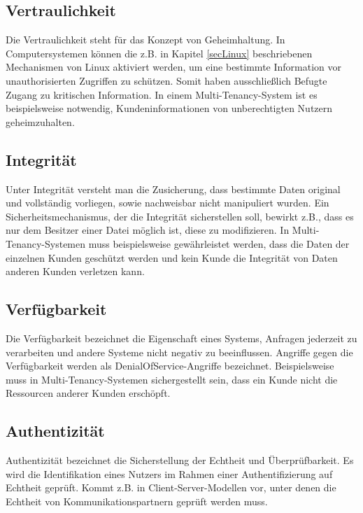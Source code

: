 \documentclass[../main.tex]{subfiles}
\begin{document}


    \subsection{Vertraulichkeit}
			Die Vertraulichkeit steht für das Konzept von Geheimhaltung. In Computersystemen können die z.B. in Kapitel \ref{secLinux} beschriebenen Mechanismen von Linux aktiviert werden, um eine bestimmte Information vor unauthorisierten Zugriffen zu schützen. Somit haben ausschließlich Befugte Zugang zu kritischen Information. In einem Multi-Tenancy-System ist es beispielsweise notwendig, Kundeninformationen von unberechtigten Nutzern geheimzuhalten.

    \subsection{Integrität}
			Unter Integrität versteht man die Zusicherung, dass bestimmte Daten original und vollständig vorliegen, sowie nachweisbar nicht manipuliert wurden. Ein Sicherheitsmechanismus, der die Integrität sicherstellen soll, bewirkt z.B., dass es nur dem Besitzer einer Datei möglich ist, diese zu modifizieren. In Multi-Tenancy-Systemen muss beispielsweise gewährleistet werden, dass die Daten der einzelnen Kunden geschützt werden und kein Kunde die Integrität von Daten anderen Kunden verletzen kann.

    \subsection{Verfügbarkeit}
			Die Verfügbarkeit bezeichnet die Eigenschaft eines Systems, Anfragen jederzeit zu verarbeiten und andere Systeme nicht negativ zu beeinflussen. Angriffe gegen die Verfügbarkeit werden als \gls{DenialOfService}-Angriffe bezeichnet. Beispielsweise muss in Multi-Tenancy-Systemen sichergestellt sein, dass ein Kunde nicht die Ressourcen anderer Kunden erschöpft.

		\subsection{Authentizität}
			Authentizität bezeichnet die Sicherstellung der Echtheit und Überprüfbarkeit. Es wird die Identifikation eines Nutzers im Rahmen einer Authentifizierung auf Echtheit geprüft. Kommt z.B. in Client-Server-Modellen vor, unter denen die Echtheit von Kommunikationspartnern geprüft werden muss.
\end{document}
